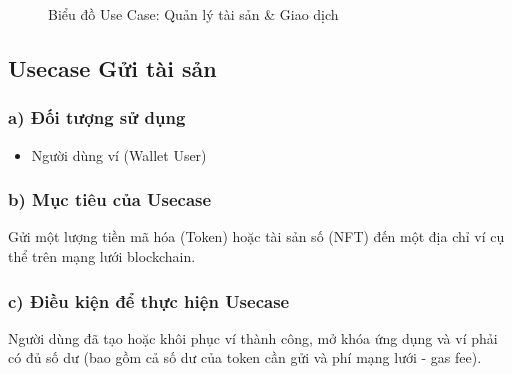 \documentclass[a4paper]{report}
\begin{document}
\begin{figure}[h]
{
    }
    \caption{Biểu đồ Use Case: Quản lý tài sản \& Giao dịch}
    \label{fig:uc-asset-management}
\end{figure}

\subsection{Usecase Gửi tài sản}

\subsubsection{a) Đối tượng sử dụng}
\begin{itemize}
    \item Người dùng ví (Wallet User)
\end{itemize}

\subsubsection{b) Mục tiêu của Usecase}
Gửi một lượng tiền mã hóa (Token) hoặc tài sản số (NFT) đến một địa chỉ ví cụ thể trên mạng lưới blockchain.

\subsubsection{c) Điều kiện để thực hiện Usecase}
Người dùng đã tạo hoặc khôi phục ví thành công, mở khóa ứng dụng và ví phải có đủ số dư (bao gồm cả số dư của token cần gửi và phí mạng lưới - gas fee).
\end{document}
